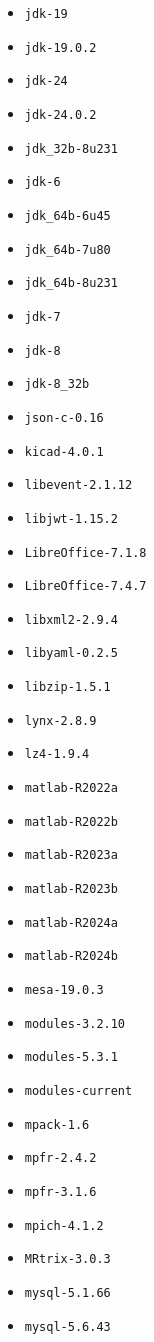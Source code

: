 \begin{multicols}{3}
\begin{itemize}
\item \verb|jdk-19|
\item \verb|jdk-19.0.2|
\item \verb|jdk-24|
\item \verb|jdk-24.0.2|
\item \verb|jdk_32b-8u231|
\item \verb|jdk-6|
\item \verb|jdk_64b-6u45|
\item \verb|jdk_64b-7u80|
\item \verb|jdk_64b-8u231|
\item \verb|jdk-7|
\item \verb|jdk-8|
\item \verb|jdk-8_32b|
\item \verb|json-c-0.16|
\item \verb|kicad-4.0.1|
\item \verb|libevent-2.1.12|
\item \verb|libjwt-1.15.2|
\item \verb|LibreOffice-7.1.8|
\item \verb|LibreOffice-7.4.7|
\item \verb|libxml2-2.9.4|
\item \verb|libyaml-0.2.5|
\item \verb|libzip-1.5.1|
\item \verb|lynx-2.8.9|
\item \verb|lz4-1.9.4|
\item \verb|matlab-R2022a|
\item \verb|matlab-R2022b|
\item \verb|matlab-R2023a|
\item \verb|matlab-R2023b|
\item \verb|matlab-R2024a|
\item \verb|matlab-R2024b|
\item \verb|mesa-19.0.3|
\item \verb|modules-3.2.10|
\item \verb|modules-5.3.1|
\item \verb|modules-current|
\item \verb|mpack-1.6|
\item \verb|mpfr-2.4.2|
\item \verb|mpfr-3.1.6|
\item \verb|mpich-4.1.2|
\item \verb|MRtrix-3.0.3|
\item \verb|mysql-5.1.66|
\item \verb|mysql-5.6.43|

\end{itemize}
\end{multicols}
